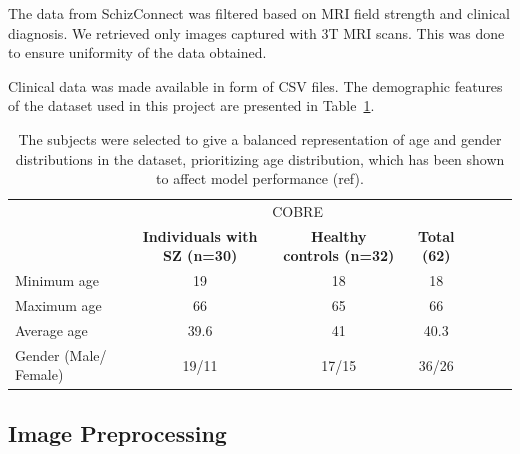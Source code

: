 The data from SchizConnect was filtered based on MRI field strength and clinical diagnosis. We retrieved only images captured with 3T MRI scans. This was done to ensure uniformity of the data obtained.

Clinical data was made available in form of CSV files. The demographic features of the dataset used in this project are presented in Table~\ref{tab:cobre_clinical_demographic}.



\begin{center}
	\begin{table}
        \centering
        \caption{\label{tab:cobre_clinical_demographic}The subjects were selected to give a balanced representation of age and gender distributions in the dataset, prioritizing age distribution, which has been shown to affect model performance (ref).}
        \begin{tabular*}{500pt}{@{\extracolsep\fill}lcccccc@{\extracolsep\fill}}
            \toprule
            & \multicolumn{3}{c}{COBRE}
            \\\cmidrule{2-4}
            & \textbf{Individuals with SZ (n=30)} & \textbf{Healthy controls (n=32)} & \textbf{Total (62)} \\
            \midrule
            Minimum age             & 19  & 18  & 18 \\
            Maximum age 		    & 66  & 65 & 66  \\
            Average age             & 39.6 & 41 & 40.3	\\
            Gender (Male/ Female)   & 19/11 & 17/15 & 36/26	\\
            \bottomrule
        \end{tabular*}
    \end{table}    
\end{center}

%
\subsection{Image Preprocessing}

